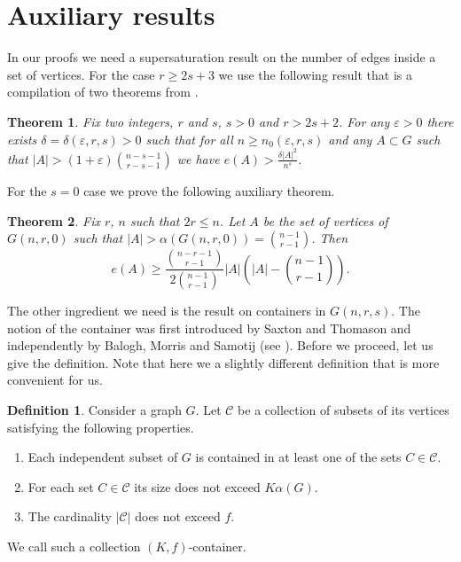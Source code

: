\documentclass[10pt,a4paper]{article}
\newtheorem{theorem}{Theorem}
\theoremstyle{remark}
\theoremstyle{definition}
\newtheorem{definition}{Definition}[section]
\newcommand{\skob}[1]{\left(#1\right)}
\begin{document}
\section{Auxiliary results}

In our proofs we need a supersaturation result on the number of edges inside a set of vertices. For the case $r \geq 2s+3$ we use the following result that is a compilation of two theorems from \cite{ShKup}.

\begin{theorem}\label{SuperSat}
    Fix two integers, $r$ and $s$, $s > 0$ and $r > 2s + 2$. For any $\varepsilon > 0$ there exists $\delta = \delta(\varepsilon, r, s) > 0$ such that for all $n \geq n_0(\varepsilon,r,s)$ and any $A \subset G$ such that $|A| > (1 + \varepsilon)\binom{n-s-1}{r-s-1}$ we have $e(A) > \frac{\delta |A|^2}{n^s}$.
\end{theorem}

For the $s = 0$ case we prove the following auxiliary theorem.

\begin{theorem}
	\label{Spectr}
	Fix $r$, $n$ such that $2r \leq n$. Let $A$ be the set of vertices of $G(n,r,0)$ such that $|A| > \alpha(G(n,r,0)) = \binom{n-1}{r-1}$. Then
	$$
		e(A) \geq \frac{\binom{n-r-1}{r-1}}{2\binom{n-1}{r-1}}|A|\skob{|A| - \binom{n-1}{r-1}}.
	$$
\end{theorem}

The other ingredient we need is the result on containers in $G(n,r,s)$. The notion of the container was first introduced by Saxton and Thomason and independently by Balogh, Morris and Samotij (see \cite{Cont1, Cont2}). Before we proceed, let us give the definition. Note that here we a slightly different definition that is more convenient for us.

\begin{definition}
    Consider a graph $G$. Let $\mathcal{C}$ be a collection of subsets of its vertices satisfying the following properties.
    \begin{enumerate}
        \item Each independent subset of $G$ is contained in at least one of the sets $C \in \mathcal{C}$.

        \item For each set $C \in \mathcal{C}$ its size does not exceed $K\alpha(G)$.

        \item The cardinality $|\mathcal{C}|$ does not exceed $f$.
    \end{enumerate}
    We call such a collection $(K, f)$-container.
\end{definition}
\end{document}
